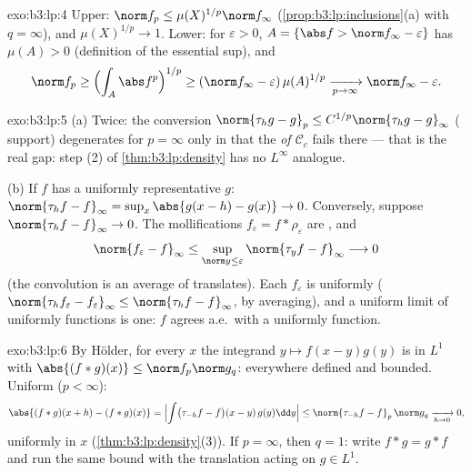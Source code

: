 \begin{solution}{exo:b3:lp:4}
Upper: $\norm f_p \leq \mu(X)^{1/p}\norm f_\infty$
(\cref{prop:b3:lp:inclusions}(a) with $q = \infty$), and
$\mu(X)^{1/p} \to 1$. Lower: for $\varepsilon > 0$, $A =
\{\abs f > \norm f_\infty - \varepsilon\}$ has $\mu(A) > 0$
(definition of the essential sup), and
\[
\norm f_p \geq \Bigl(\int_A \abs f^p\Bigr)^{1/p}
\geq (\norm f_\infty - \varepsilon)\,\mu(A)^{1/p}
\xrightarrow[p\to\infty]{} \norm f_\infty - \varepsilon .
\]
\end{solution}

\begin{solution}{exo:b3:lp:5}
(a) Twice: the conversion $\norm{\tau_hg - g}_p \leq
C^{1/p}\norm{\tau_hg - g}_\infty$ ( support)
degenerates for $p = \infty$ only in that the \emph{ of
$\mathcal C_c$} fails there --- that is the real gap: step (2)
of \cref{thm:b3:lp:density} has no $L^\infty$ analogue.

(b) If $f$ has a uniformly  representative $g$:
$\norm{\tau_hf - f}_\infty = \sup_x\abs{g(x - h) - g(x)} \to
0$. Conversely, suppose $\norm{\tau_hf - f}_\infty \to 0$. The
mollifications $f_\varepsilon = f * \rho_\varepsilon$ are
, and
\[
\norm{f_\varepsilon - f}_\infty
\leq \sup_{\norm y \leq \varepsilon}\norm{\tau_yf -
f}_\infty \longrightarrow 0
\]
(the convolution is an average of translates). Each
$f_\varepsilon$ is uniformly 
($\norm{\tau_hf_\varepsilon - f_\varepsilon}_\infty \leq
\norm{\tau_hf - f}_\infty$, by averaging), and a uniform limit
of uniformly  functions is one: $f$ agrees a.e.\
with a uniformly  function.
\end{solution}

\begin{solution}{exo:b3:lp:6}
By H\"older, for every $x$ the integrand $y \mapsto f(x -
y)g(y)$ is in $L^1$ with $\abs{(f*g)(x)} \leq \norm f_p\norm
g_q$: everywhere defined and bounded. Uniform  ($p <
\infty$):
\[
\abs{(f*g)(x + h) - (f*g)(x)}
= \Bigl|\int\bigl(\tau_{-h}f - f\bigr)(x - y)\,g(y)\dd y\Bigr|
\leq \norm{\tau_{-h}f - f}_p\,\norm g_q
\xrightarrow[h\to0]{} 0,
\]
uniformly in $x$ (\cref{thm:b3:lp:density}(3)). If $p =
\infty$, then $q = 1$: write $f * g = g * f$ and run the same
bound with the translation acting on $g \in L^1$.
\end{solution}

